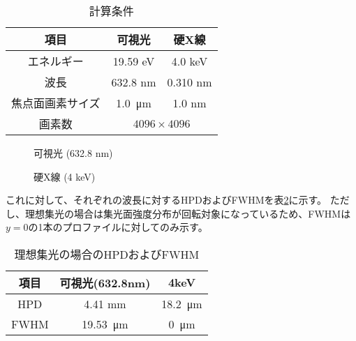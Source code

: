 \begin{table}[!ht]
\begin{center}
  \caption[]{計算条件}
  \begin{tabular}{|c c c|} \hline
    項目 & 可視光 & 硬X線 \\ \hline
    エネルギー & 19.59 eV & 4.0 keV \\
    波長 & 632.8 nm & 0.310 nm \\
    焦点面画素サイズ & \SI{1.0}{\micro \metre} & 1.0 nm \\
    画素数 & \multicolumn{2}{c|}{$4096 \times 4096$} \\\hline
  \end{tabular}
  \label{tb:ideal_simulation_params}
\end{center}
\end{table}

\begin{figure}[!ht]
\centering
{}
\caption[]{可視光 (632.8 nm)}
\label{fig:ideal_simulation_visible}
\end{figure}

\begin{figure}[!ht]
\centering
{}
\caption[]{硬X線 (4 keV)}
\label{fig:ideal_simulation_xray}
\end{figure}


これに対して、それぞれの波長に対するHPDおよびFWHMを表\ref{tb:ideal_focus_evaluation}に示す。
ただし、理想集光の場合は集光面強度分布が回転対象になっているため、FWHMは$y=0$の1本のプロファイルに対してのみ示す。

\begin{table}[!ht]
\begin{center}
  \caption{理想集光の場合のHPDおよびFWHM}
  \begin{tabular}{|c|c|c|} \hline
    項目 & 可視光(632.8nm) & 4keV \\ \hline
    HPD & 4.41 mm & \SI{18.2}{\micro \metre} \\
    FWHM & \SI{19.53}{\micro \metre} & \SI{0}{\micro \metre} \\ \hline
  \end{tabular}
  \label{tb:ideal_focus_evaluation}
\end{center}
\end{table}

